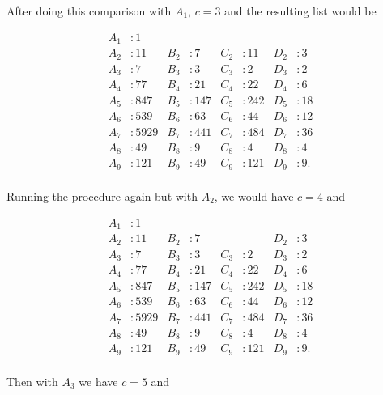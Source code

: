 \documentclass[12pt, a4paper]{article}
\begin{document}
\newpage

After doing this comparison with $A_1$, $c=3$ and the resulting list would be

\begin{align*}
        A_1 & : 1 &  &  &  &  &  & \\
        A_2 & : 11 & B_2 & : 7 & C_2 & : 11 & D_2 & : 3\\ 
        A_3 & : 7 & B_3 & : 3 & C_3 & : 2& D_3 & : 2\\ 
        A_4 & : 77 & B_4 & : 21 & C_4 & : 22& D_4 & : 6\\
        A_5 & : 847 & B_5 & : 147& C_5 & : 242& D_5 & : 18\\ 
        A_6 & : 539& B_6 & : 63& C_6 & : 44& D_6 & : 12\\ 
        A_7 & : 5929& B_7 & :441 & C_7 & : 484& D_7 & : 36 \\ 
        A_8 & : 49& B_8 & : 9 & C_8 & : 4& D_8 & : 4 \\ 
        A_9 & : 121& B_9 & : 49 & C_9 & :121 & D_9 & : 9. \\ 
\end{align*}

Running the procedure again but with $A_2$, we would have $c=4$ and

\begin{align*}
        A_1 & : 1 &  &  &  &  &  & \\
        A_2 & : 11 & B_2 & : 7 &  &  & D_2 & : 3\\ 
        A_3 & : 7 & B_3 & : 3 & C_3 & : 2& D_3 & : 2\\ 
        A_4 & : 77 & B_4 & : 21 & C_4 & : 22& D_4 & : 6\\
        A_5 & : 847 & B_5 & : 147& C_5 & : 242& D_5 & : 18\\ 
        A_6 & : 539& B_6 & : 63& C_6 & : 44& D_6 & : 12\\ 
        A_7 & : 5929& B_7 & :441 & C_7 & : 484& D_7 & : 36 \\ 
        A_8 & : 49& B_8 & : 9 & C_8 & : 4& D_8 & : 4 \\ 
        A_9 & : 121& B_9 & : 49 & C_9 & :121 & D_9 & : 9. \\ 
\end{align*}

Then with $A_3$ we have $c=5$ and
\end{document}
